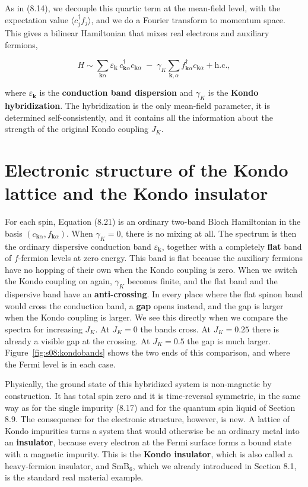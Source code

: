 As in (8.14), we decouple this quartic term at the mean-field level, with the expectation value
$\langle c^\dagger_j f_j\rangle$, and we do a Fourier transform to momentum space. This gives a
bilinear Hamiltonian that mixes real electrons and auxiliary fermions,

\begin{equation}
H \sim \sum_{\mathbf k\alpha} \varepsilon_{\mathbf k}\, c^\dagger_{\mathbf k\alpha} c_{\mathbf
k\alpha} \;-\; \gamma_K \sum_{\mathbf k,\alpha} f^\dagger_{\mathbf k\alpha}c_{\mathbf k\alpha} +
\text{h.c.},
\end{equation}

where $\varepsilon_{\mathbf k}$ is the \textbf{conduction band dispersion} and $\gamma_K$ is the
\textbf{Kondo hybridization}. The hybridization is the only mean-field parameter, it is determined
self-consistently, and it contains all the information about the strength of the original Kondo
coupling $J_K$.

\section{Electronic structure of the Kondo lattice and the Kondo insulator}

For each spin, Equation (8.21) is an ordinary two-band Bloch Hamiltonian in the basis $(c_{\mathbf
k\alpha}, f_{\mathbf k\alpha})$. When $\gamma_K = 0$, there is no mixing at all. The spectrum is
then the ordinary dispersive conduction band $\varepsilon_{\mathbf k}$, together with a completely
\textbf{flat} band of $f$-fermion levels at zero energy. This band is flat because the auxiliary
fermions have no hopping of their own when the Kondo coupling is zero. When we switch the Kondo
coupling on again, $\gamma_K$ becomes finite, and the flat band and the dispersive band have an
\textbf{anti-crossing}. In every place where the flat spinon band would cross the conduction band,
a \textbf{gap} opens instead, and the gap is larger when the Kondo coupling is larger. We see this
directly when we compare the spectra for increasing $J_K$. At $J_K=0$ the bands cross. At
$J_K=0.25$ there is already a visible gap at the crossing. At $J_K=0.5$ the gap is much larger.
Figure~\ref{fig:s08:kondobands} shows the two ends of this comparison, and where the Fermi level is
in each case.



Physically, the ground state of this hybridized system is non-magnetic by construction. It has
total spin zero and it is time-reversal symmetric, in the same way as for the single impurity
(8.17) and for the quantum spin liquid of Section 8.9. The consequence for the electronic
structure, however, is new. A lattice of Kondo impurities turns a system that would otherwise be an
ordinary metal into an \textbf{insulator}, because every electron at the Fermi surface forms a
bound state with a magnetic impurity. This is the \textbf{Kondo insulator}, which is also called a
heavy-fermion insulator, and SmB$_6$, which we already introduced in Section 8.1, is the standard
real material example.

